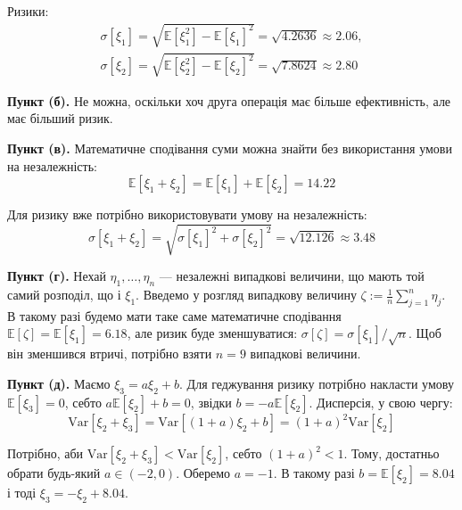 \documentclass{hw_template}
\begin{document}
Ризики:
\begin{gather*}
    \sigma[\xi_1] = \sqrt{\mathbb{E}[\xi_1^2] - \mathbb{E}[\xi_1]^2} = \sqrt{4.2636} \approx 2.06, \\
    \sigma[\xi_2] = \sqrt{\mathbb{E}[\xi_2^2] - \mathbb{E}[\xi_2]^2} = \sqrt{7.8624} \approx 2.80
\end{gather*}

\textbf{Пункт (б).} Не можна, оскільки хоч друга операція має більше ефективність,
але має більший ризик.

\textbf{Пункт (в).} Математичне сподівання суми можна знайти без використання
умови на незалежність:
\begin{equation*}
    \mathbb{E}[\xi_1 + \xi_2] = \mathbb{E}[\xi_1] + \mathbb{E}[\xi_2] = 14.22
\end{equation*}

Для ризику вже потрібно використовувати умову на незалежність:
\begin{equation*}
    \sigma[\xi_1 + \xi_2] = \sqrt{\sigma[\xi_1]^2 + \sigma[\xi_2]^2} = \sqrt{12.126} \approx 3.48
\end{equation*}

\textbf{Пункт (г).} Нехай $\eta_1,\dots,\eta_n$ --- незалежні випадкові величини,
що мають той самий розподіл, що і $\xi_1$. Введемо у розгляд випадкову величину 
$\zeta := \frac{1}{n}\sum_{j=1}^n\eta_j$. В такому разі будемо мати таке саме 
математичне сподівання $\mathbb{E}[\zeta] = \mathbb{E}[\xi_1] = 6.18$, але ризик
буде зменшуватися: $\sigma[\zeta] = \sigma[\xi_1]/\sqrt{n}$. Щоб він зменшився 
втричі, потрібно взяти $n=9$ випадкові величини.

\textbf{Пункт (д).} Маємо $\xi_3 = a\xi_2 + b$. Для геджування ризику потрібно
накласти умову $\mathbb{E}[\xi_3]=0$, себто $a\mathbb{E}[\xi_2]+b=0$, звідки 
$b=-a\mathbb{E}[\xi_2]$. Дисперсія, у свою чергу:
\begin{equation*}
    \text{Var}[\xi_2+\xi_3] = \text{Var}[(1+a)\xi_2 + b] = (1+a)^2\text{Var}[\xi_2]
\end{equation*}

Потрібно, аби $\text{Var}[\xi_2+\xi_3] < \text{Var}[\xi_2]$, себто $(1+a)^2<1$.
Тому, достатньо обрати будь-який $a \in (-2, 0)$. Оберемо $a=-1$. 
В такому разі $b=\mathbb{E}[\xi_2]=8.04$ і тоді $\xi_3=-\xi_2+8.04$. 
\end{document}
